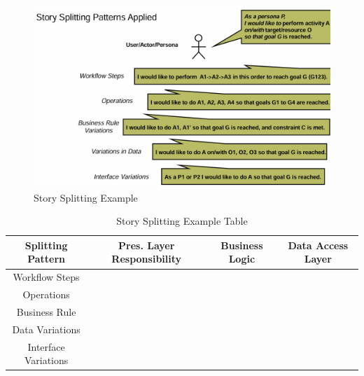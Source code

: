 \documentclass[../Main.tex]{subfiles}
\begin{document}
\begin{figure}[H]
    \centering
    \includegraphics{Images/appliedstorysplitting.png}
    \caption{Story Splitting Example}
\end{figure}

\begin{table}
    \centering
    \begin{tabular}{|c|c|c|c|} \hline 
        Splitting Pattern&  Pres. Layer Responsibility &  Business Logic& Data Access Layer\\ \hline 
        Workflow Steps&  &  & \\ \hline 
        Operations&  &  & \\ \hline 
        Business Rule&  &  & \\ \hline 
        Data Variations&  &  & \\ \hline 
        Interface Variations& & &\\ \hline
    \end{tabular}
    \caption{Story Splitting Example Table}
    \label{tab:storysplitex}
\end{table}
\end{document}
